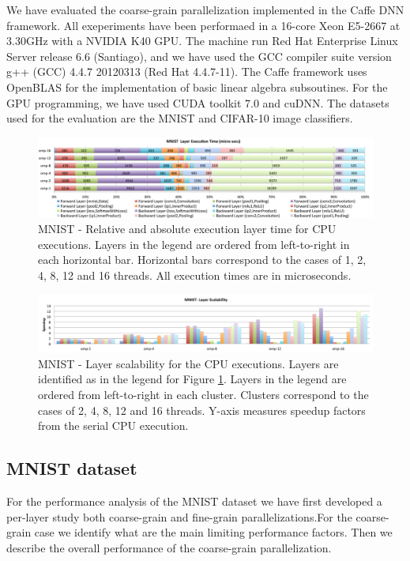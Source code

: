 We have evaluated the coarse-grain parallelization implemented in 
the Caffe DNN framework. All exeperiments have been performaed 
in a 16-core Xeon E5-2667 at 3.30GHz with a NVIDIA K40 GPU. 
The machine run Red Hat Enterprise Linux Server release 6.6 (Santiago), 
and we have used the GCC compiler suite version g++ (GCC) 4.4.7 20120313 
(Red Hat 4.4.7-11). The Caffe framework uses OpenBLAS for the implementation 
of basic linear algebra subsoutines. For the GPU programming, we have 
used CUDA toolkit 7.0 and cuDNN. The datasets used for the evaluation are 
the MNIST and CIFAR-10 image classifiers.

\begin{figure}[]
\includegraphics[width=\linewidth]{figures/mnist-rel-abs-time.pdf}
\caption{MNIST - Relative and absolute execution layer time for CPU executions. Layers in the legend are ordered from left-to-right in each horizontal bar. Horizontal bars correspond to the cases of 1, 2, 4, 8, 12 and 16 threads. All execution times are in microseconds.}
\label{fig-mnist-abs-rel}
\end{figure}

\begin{figure}[]
\includegraphics[width=\textwidth]{figures/mnist-scalability-layer.pdf}
\caption{MNIST - Layer scalability for the CPU executions. Layers are identified as in the legend for Figure \ref{fig-mnist-abs-rel}. Layers in the legend are ordered from left-to-right in each cluster. Clusters correspond to the cases of 2, 4, 8, 12 and 16 threads. Y-axis measures speedup factors from the serial CPU execution.}
\label{fig-mnist-scalability}
\end{figure}

\subsection{MNIST dataset}
For the performance analysis of the MNIST dataset we have first 
developed a per-layer study both coarse-grain and fine-grain parallelizations.For the coarse-grain case we identify what are the main limiting 
performance factors. Then we describe the overall performance of the 
coarse-grain parallelization. 

